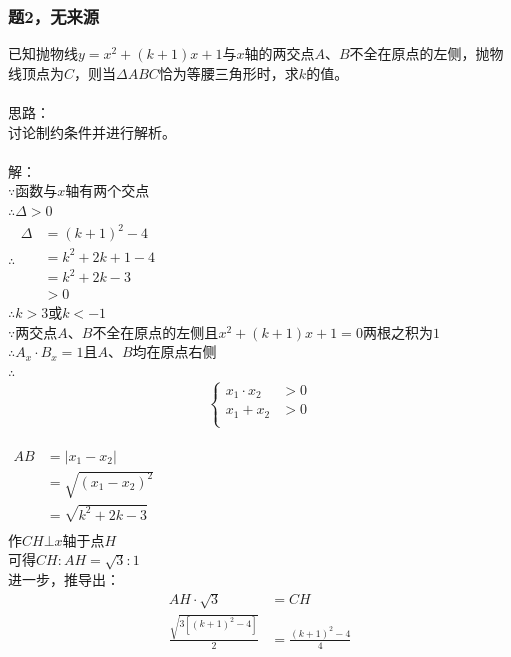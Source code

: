 \documentclass[12pt]{article}
\begin{document}
		\subsubsection{题2，无来源}
			已知抛物线$y=x^2+(k+1)x+1$与$x$轴的两交点$A$、$B$不全在原点的左侧，抛物线顶点为$C$，则当$\Delta{}ABC$恰为等腰三角形时，求$k$的值。\\
			\\
			思路：\\
			讨论制约条件并进行解析。\\
			\\
			解：\\
			$\because{}$函数与$x$轴有两个交点\\
			$\therefore{}\Delta{}>0$\\
			$\therefore{}\begin{aligned}
				\Delta{}&=(k+1)^{2}-4\\
				&=k^{2}+2k+1-4\\
				&=k^{2}+2k-3\\
				&>0
			\end{aligned}$\\
			$\therefore{}k>3$或$k<-1$\\
			$\because{}$两交点$A$、$B$不全在原点的左侧且$x^2+(k+1)x+1=0$两根之积为$1$\\
			$\therefore{}A_{x}\cdot{}B_{x}=1$且$A$、$B$均在原点右侧\\
			$\therefore{}$\begin{equation}
				\left\{
					\begin{aligned}
						x_{1}\cdot{}x_{2}&>0\\
						x_{1}+x_{2}&>0\\
					\end{aligned}
				\right.
			\end{equation}\\
			$\begin{aligned}
				AB&=|x_{1}-x_{2}|\\
					&=\sqrt{(x_{1}-x_{2})^{2}}\\
					&=\sqrt{k^{2}+2k-3}\\
			\end{aligned}$\\
			作$CH\bot{}x$轴于点$H$\\
			可得$CH:AH=\sqrt{3}:1$\\
			进一步，推导出：\\
			\begin{equation}
				\begin{aligned}
					AH\cdot{}\sqrt{3}&=CH\\
					\frac{\sqrt{3[(k+1)^{2}-4]}}{2}&=\frac{(k+1)^{2}-4}{4}\\
				\end{aligned}
			\end{equation}
\end{document}
